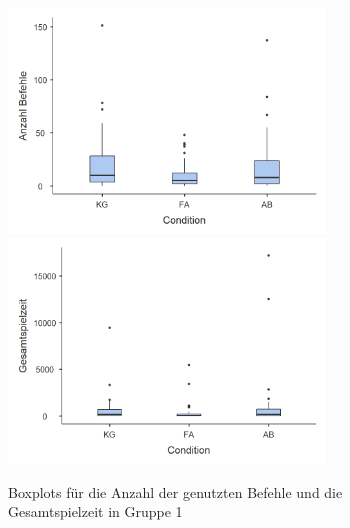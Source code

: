 \begin{figure}[htbp]
    \centering
    \includegraphics[width=0.75\textwidth]{img/boxplot/befehle_1_box_plot.png}
    \includegraphics[width=0.75\textwidth]{img/boxplot/zeit_1_box_plot.png}
    \caption{Boxplots für die Anzahl der genutzten Befehle und die Gesamtspielzeit in Gruppe 1}
\end{figure}


